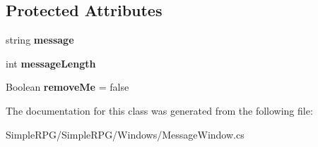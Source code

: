 \subsection*{Protected Attributes}
\begin{DoxyCompactItemize}
\item 
\hypertarget{class_simple_r_p_g_1_1_windows_1_1_message_window_a69bd0d73bf3f010d325f9162e59331be}{string {\bfseries message}}\label{class_simple_r_p_g_1_1_windows_1_1_message_window_a69bd0d73bf3f010d325f9162e59331be}

\item 
\hypertarget{class_simple_r_p_g_1_1_windows_1_1_message_window_a90d77890d714f454bb14a131e409821a}{int {\bfseries message\-Length}}\label{class_simple_r_p_g_1_1_windows_1_1_message_window_a90d77890d714f454bb14a131e409821a}

\item 
\hypertarget{class_simple_r_p_g_1_1_windows_1_1_message_window_aeaf30e10ea84c29970d99d2162439050}{Boolean {\bfseries remove\-Me} = false}\label{class_simple_r_p_g_1_1_windows_1_1_message_window_aeaf30e10ea84c29970d99d2162439050}

\end{DoxyCompactItemize}


The documentation for this class was generated from the following file\-:\begin{DoxyCompactItemize}
\item 
Simple\-R\-P\-G/\-Simple\-R\-P\-G/\-Windows/Message\-Window.\-cs\end{DoxyCompactItemize}
